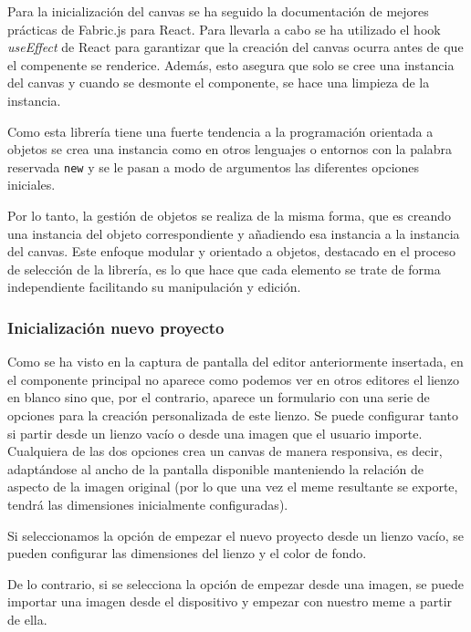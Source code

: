 Para la inicialización del canvas se ha seguido la documentación de mejores prácticas de Fabric.js para React. Para llevarla a cabo se ha utilizado el hook \textit{useEffect} de React para garantizar que la creación del canvas ocurra antes de que el compenente se renderice. Además, esto asegura que solo se cree una instancia del canvas y cuando se desmonte el componente, se hace una limpieza de la instancia.

Como esta librería tiene una fuerte tendencia a la programación orientada a objetos se crea una instancia como en otros lenguajes o entornos con la palabra reservada \texttt{new} y se le pasan a modo de argumentos las diferentes opciones iniciales.

Por lo tanto, la gestión de objetos se realiza de la misma forma, que es creando una instancia del objeto correspondiente y añadiendo esa instancia a la instancia del canvas. Este enfoque modular y orientado a objetos, destacado en el proceso de selección de la librería, es lo que hace que cada elemento se trate de forma independiente facilitando su manipulación y edición.

\subsubsection{Inicialización nuevo proyecto}

Como se ha visto en la captura de pantalla del editor anteriormente insertada, en el componente principal no aparece como podemos ver en otros editores el lienzo en blanco sino que, por el contrario, aparece un formulario con una serie de opciones para la creación personalizada de este lienzo. Se puede configurar tanto si partir desde un lienzo vacío o desde una imagen que el usuario importe. Cualquiera de las dos opciones crea un canvas de manera responsiva, es decir, adaptándose al ancho de la pantalla disponible manteniendo la relación de aspecto de la imagen original (por lo que una vez el meme resultante se exporte, tendrá las dimensiones inicialmente configuradas).

Si seleccionamos la opción de empezar el nuevo proyecto desde un lienzo vacío, se pueden configurar las dimensiones del lienzo y el color de fondo.

De lo contrario, si se selecciona la opción de empezar desde una imagen, se puede importar una imagen desde el dispositivo y empezar con nuestro meme a partir de ella.

